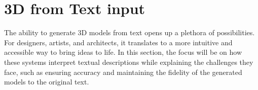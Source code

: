 \section{3D from Text input}\label{3d from text}

The ability to generate 3D models from text opens up a plethora of possibilities. For designers, artists, and architects, it translates to a more intuitive and accessible way to bring ideas to life. In this section, the focus will be on how these systems interpret textual descriptions while explaining the challenges they face, such as ensuring accuracy and maintaining the fidelity of the generated models to the original text.

%



